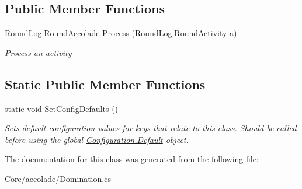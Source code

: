 \subsection*{Public Member Functions}
\begin{DoxyCompactItemize}
\item 
\hypertarget{class_m_b_c_1_1_core_1_1mbc_1_1accolade_1_1_domination_a040a6f1da35856d780a747414a0cd632}{\hyperlink{class_m_b_c_1_1_core_1_1_round_log_a4060830ca7135aa755ec5b6d24aa30e6}{Round\-Log.\-Round\-Accolade} \hyperlink{class_m_b_c_1_1_core_1_1mbc_1_1accolade_1_1_domination_a040a6f1da35856d780a747414a0cd632}{Process} (\hyperlink{class_m_b_c_1_1_core_1_1_round_log_1_1_round_activity}{Round\-Log.\-Round\-Activity} a)}\label{class_m_b_c_1_1_core_1_1mbc_1_1accolade_1_1_domination_a040a6f1da35856d780a747414a0cd632}

\begin{DoxyCompactList}\small\item\em Process an activity\end{DoxyCompactList}\end{DoxyCompactItemize}
\subsection*{Static Public Member Functions}
\begin{DoxyCompactItemize}
\item 
\hypertarget{class_m_b_c_1_1_core_1_1mbc_1_1accolade_1_1_domination_a9223d2e72a347cd1d267d535f016e75a}{static void \hyperlink{class_m_b_c_1_1_core_1_1mbc_1_1accolade_1_1_domination_a9223d2e72a347cd1d267d535f016e75a}{Set\-Config\-Defaults} ()}\label{class_m_b_c_1_1_core_1_1mbc_1_1accolade_1_1_domination_a9223d2e72a347cd1d267d535f016e75a}

\begin{DoxyCompactList}\small\item\em Sets default configuration values for keys that relate to this class. Should be called before using the global \hyperlink{class_m_b_c_1_1_core_1_1_configuration_a5db184730b6c51c2ae617d0fc1976c13}{Configuration.\-Default} object.\end{DoxyCompactList}\end{DoxyCompactItemize}


The documentation for this class was generated from the following file\-:\begin{DoxyCompactItemize}
\item 
Core/accolade/Domination.\-cs\end{DoxyCompactItemize}
